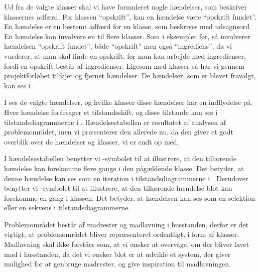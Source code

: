 Ud fra de valgte klasser skal vi have formuleret nogle hændelser, som beskriver klassernes adfærd. For klassen ``opskrift'', kan en hændelse \fx være ``opskrift fundet''. En hændelse er en bestemt adfærd for en klasse, som beskrives med udsagnsord. En hændelse kan involvere en til flere klasser. Som i eksemplet før, så involverer hændelsen ``opskrift fundet'', både ``opskrift'' men også ``ingrediens'', da vi vurderer, at man skal finde en opskrift, før man kan arbejde med ingredienser, fordi en opskrift består af ingredienser. Ligesom med klasser så har vi gennem projektforløbet tilføjet og fjernet hændelser. De hændelser, som er blevet fravalgt, kan ses i .

I  ses de valgte hændelser, og hvilke klasser disse hændelser har en indflydelse på. Hver hændelse forårsager et tilstandsskift, og disse tilstande kan ses i tilstandsdiagrammerne i . Hændelsestabellen er resultatet af analysen af problemområdet, men vi præsenterer den allerede nu, da den giver et godt overblik over de hændelser og klasser, vi er endt op med. 

I hændelsestabellen benytter vi \iter-symbolet til at illustrere, at den tilhørende hændelse kan forekomme flere gange i den pågældende klasse. Det betyder, at denne hændelse kan ses som en iteration i tilstandsdiagrammerne i . Derudover benytter vi \once-symbolet til at illustrere, at den tilhørende hændelse blot kan forekomme en gang i klassen. Det betyder, at hændelsen kan ses som en selektion eller en sekvens i tilstandsdiagrammerne.



Problemområdet består af madrester og madlavning i husstanden, derfor er det vigtigt, at problemområdet bliver repræsenteret ordentligt, i form af klasser. Madlavning skal ikke forståes som, at vi ønsker at overvåge, om der bliver lavet mad i husstanden, da det vi ønsker blot er at udvikle et system, der giver mulighed for at genbruge madrester, og give inspiration til madlavningen.
